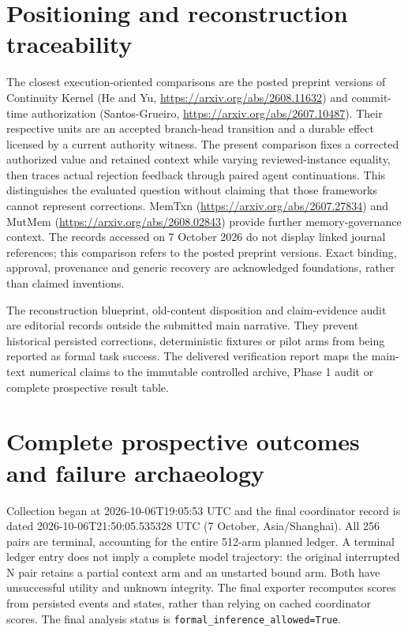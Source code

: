 \documentclass[11pt,a4paper]{article}
\newcommand{\code}[1]{\nolinkurl{#1}}
\begin{document}
\section{Positioning and reconstruction traceability}
The closest execution-oriented comparisons are the posted preprint versions of Continuity Kernel (He and Yu, \url{https://arxiv.org/abs/2608.11632}) and commit-time authorization (Santos-Grueiro, \url{https://arxiv.org/abs/2607.10487}). Their respective units are an accepted branch-head transition and a durable effect licensed by a current authority witness. The present comparison fixes a corrected authorized value and retained context while varying reviewed-instance equality, then traces actual rejection feedback through paired agent continuations. This distinguishes the evaluated question without claiming that those frameworks cannot represent corrections. MemTxn (\url{https://arxiv.org/abs/2607.27834}) and MutMem (\url{https://arxiv.org/abs/2608.02843}) provide further memory-governance context. The records accessed on 7 October 2026 do not display linked journal references; this comparison refers to the posted preprint versions. Exact binding, approval, provenance and generic recovery are acknowledged foundations, rather than claimed inventions.

The reconstruction blueprint, old-content disposition and claim-evidence audit are editorial records outside the submitted main narrative. They prevent historical persisted corrections, deterministic fixtures or pilot arms from being reported as formal task success. The delivered verification report maps the main-text numerical claims to the immutable controlled archive, Phase 1 audit or complete prospective result table.

\section{Complete prospective outcomes and failure archaeology}
\label{app:phase2-results}
Collection began at 2026-10-06T19:05:53 UTC and the final coordinator record is dated 2026-10-06T21:50:05.535328 UTC (7 October, Asia/Shanghai). All 256 pairs are terminal, accounting for the entire 512-arm planned ledger. A terminal ledger entry does not imply a complete model trajectory: the original interrupted N pair retains a partial context arm and an unstarted bound arm. Both have unsuccessful utility and unknown integrity. The final exporter recomputes scores from persisted events and states, rather than relying on cached coordinator scores. The final analysis status is \code{formal_inference_allowed=True}.
\end{document}
